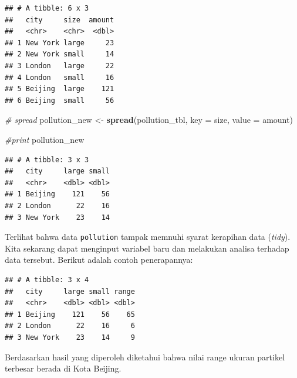 \documentclass[]{book}
\newenvironment{Shaded}{\begin{snugshade}}{\end{snugshade}}
\newcommand{\KeywordTok}[1]{\textcolor[rgb]{0.13,0.29,0.53}{\textbf{#1}}}
\newcommand{\DataTypeTok}[1]{\textcolor[rgb]{0.13,0.29,0.53}{#1}}
\newcommand{\StringTok}[1]{\textcolor[rgb]{0.31,0.60,0.02}{#1}}
\newcommand{\CommentTok}[1]{\textcolor[rgb]{0.56,0.35,0.01}{\textit{#1}}}
\newcommand{\OperatorTok}[1]{\textcolor[rgb]{0.81,0.36,0.00}{\textbf{#1}}}
\newcommand{\NormalTok}[1]{#1}
\begin{document}
\begin{verbatim}
## # A tibble: 6 x 3
##   city     size  amount
##   <chr>    <chr>  <dbl>
## 1 New York large     23
## 2 New York small     14
## 3 London   large     22
## 4 London   small     16
## 5 Beijing  large    121
## 6 Beijing  small     56
\end{verbatim}

\begin{Shaded}
\begin{Highlighting}[]
\CommentTok{# spread}
\NormalTok{pollution_new <-}\StringTok{ }\KeywordTok{spread}\NormalTok{(pollution_tbl,}
                        \DataTypeTok{key =}\NormalTok{ size,}
                        \DataTypeTok{value =}\NormalTok{ amount)}

\CommentTok{#print}
\NormalTok{pollution_new}
\end{Highlighting}
\end{Shaded}

\begin{verbatim}
## # A tibble: 3 x 3
##   city     large small
##   <chr>    <dbl> <dbl>
## 1 Beijing    121    56
## 2 London      22    16
## 3 New York    23    14
\end{verbatim}

Terlihat bahwa data \texttt{pollution} tampak memnuhi syarat kerapihan
data (\emph{tidy}). Kita sekarang dapat menginput variabel baru dan
melakukan analisa terhadap data tersebut. Berikut adalah contoh
penerapannya:

\begin{Shaded}
\end{Shaded}

\begin{verbatim}
## # A tibble: 3 x 4
##   city     large small range
##   <chr>    <dbl> <dbl> <dbl>
## 1 Beijing    121    56    65
## 2 London      22    16     6
## 3 New York    23    14     9
\end{verbatim}

Berdasarkan hasil yang diperoleh diketahui bahwa nilai range ukuran
partikel terbesar berada di Kota Beijing.
\end{document}
